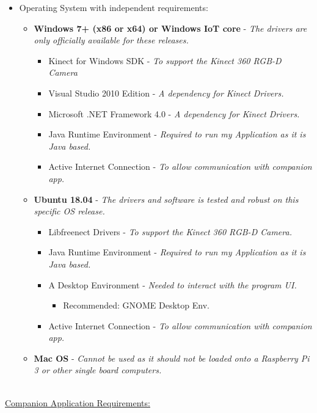 \documentclass[11pt]{report}
\begin{document}
		\begin{itemize}
			\item{Operating System with independent requirements:}
			\begin{itemize}
				\item{\textbf{Windows 7+ (x86 or x64) or Windows IoT core}} - \emph{The drivers are only officially available for these releases.}
					\begin{itemize}
						\item{Kinect for Windows SDK} - \emph{To support the Kinect 360 RGB-D Camera}
						\item{Visual Studio 2010 Edition} - \emph{A dependency for Kinect Drivers.}
						\item{Microsoft .NET Framework 4.0} - \emph{A dependency for Kinect Drivers.}
						\item{Java Runtime Environment} - \emph{Required to run my Application as it is Java based.}
						\item{Active Internet Connection} - \emph{To allow communication with companion app.}
					\end{itemize}
		
				\item{\textbf{Ubuntu 18.04}} - \emph{The drivers and software is tested and robust on this specific OS release.}
					\begin{itemize}
						\item{Libfreenect Drivers} - \emph{To support the Kinect 360 RGB-D Camera.}
						\item{Java Runtime Environment} - \emph{Required to run my Application as it is Java based.} 
						\item{A Desktop Environment} - \emph{Needed to interact with the program UI.}
						\begin{itemize}
							\item{Recommended: GNOME Desktop Env.}
						\end{itemize}
						\item{Active Internet Connection} - \emph{To allow communication with companion app.}
					\end{itemize}	
			
				\item{\textbf{Mac OS}} - \emph{Cannot be used as it should not be loaded onto a Raspberry Pi 3 or other single board computers.}
			\end{itemize}
		\end{itemize}
	~\\
	\underline{Companion Application Requirements:}
\end{document}
